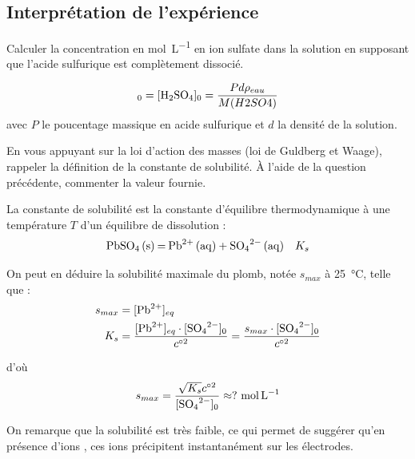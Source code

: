 \documentclass[twoside,a4paper,11pt,answers,addpoints]{exam}
\newcounter{foo} %
\begin{document}
\subsection{Interprétation de l'expérience}
\begin{questions}
\setcounter{question}{\thefoo}
\begin{framed}
\question Calculer la concentration en \si{\mole\per\liter} en ion sulfate dans la solution en supposant que l'acide sulfurique est complètement dissocié.

\begin{solution}

\begin{equation*}
[\ce{SO4^{2-}}]_0 = [\ce{H2SO4}]_0 = \frac{P d \rho_{eau } }{M (H2SO4)}
\end{equation*}
avec $P$ le poucentage massique en acide sulfurique et $d$ la densité de la solution.

\end{solution}

\end{framed}

\begin{framed}
\question En vous appuyant sur la loi d'action des masses (loi de Guldberg et Waage), rappeler la définition de la constante de solubilité. \`{A} l'aide de la question précédente, commenter la valeur fournie.

\begin{solution}
La constante de solubilité est la constante d'équilibre thermodynamique à une température $T$ d'un équilibre de dissolution : 
\begin{equation*}
\ce{PbSO4 (s) = Pb^{2+} (aq) + SO4^{2-} (aq)} \quad K_s
\end{equation*}
 
On peut en déduire la solubilité maximale du plomb, notée $s_{max}$ à \SI{25}{\celsius}, telle que : 
\begin{align*}
s_{max} &= [\ce{Pb^{2+}}]_{eq}\\
K_s &= \frac{[\ce{Pb^{2+}}]_{eq} \cdot [\ce{SO_4^{2-}}]_{0} }{c^{\circ 2}} = \frac{s_{max} \cdot [\ce{SO_4^{2-}}]_{0} }{c^{\circ 2}}
\end{align*}

d'où \begin{align*}
s_{max} = \frac{\sqrt{K_s} c^{\circ 2}}{[\ce{SO_4^{2-}}]_{0}} \approx ? ~ \si{\mole\per\liter}
\end{align*}

On remarque que la solubilité est très faible, ce qui permet de suggérer qu'en présence d'ions , ces ions précipitent instantanément sur les électrodes. 



\end{solution}
\end{framed}
\end{questions}
\end{document}

